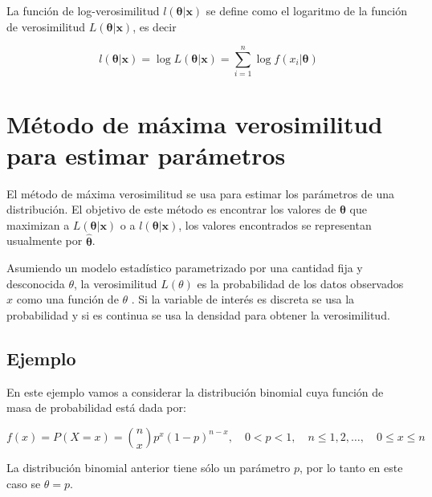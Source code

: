 \documentclass[
]{book}
\makeatletter
\newenvironment{kframe}{%
\medskip{}
\setlength{\fboxsep}{.8em}
 \def\at@end@of@kframe{}%
 \ifinner\ifhmode%
  \def\at@end@of@kframe{\end{minipage}}%
  \begin{minipage}{\columnwidth}%
 \fi\fi%
 \def\FrameCommand##1{\hskip\@totalleftmargin \hskip-\fboxsep
 \colorbox{shadecolor}{##1}\hskip-\fboxsep
     \hskip-\linewidth \hskip-\@totalleftmargin \hskip\columnwidth}%
 \MakeFramed {\advance\hsize-\width
   \@totalleftmargin\z@ \linewidth\hsize
   \@setminipage}}%
 {\par\unskip\endMakeFramed%
 \at@end@of@kframe}
\newenvironment{rmdblock}[1]
  {
  \begin{itemize}
  \renewcommand{\labelitemi}{
    \raisebox{-.7\height}[0pt][0pt]{
      {\setkeys{Gin}{width=3em,keepaspectratio}\texttt{[image: images/\#1]}}
    }
  }
  \setlength{\fboxsep}{1em}
  \begin{kframe}
  \item
  }
  {
  \end{kframe}
  \end{itemize}
  }
\newenvironment{rmdnote}
  {\begin{rmdblock}{note}}
  {\end{rmdblock}}
\makeatother
\begin{document}
La función de log-verosimilitud \(l(\boldsymbol{\theta} | \boldsymbol{x})\) se define como el logaritmo de la función de verosimilitud \(L(\boldsymbol{\theta} | \boldsymbol{x})\), es decir

\begin{equation}
l(\boldsymbol{\theta} | \boldsymbol{x}) = \log L(\boldsymbol{\theta} | \boldsymbol{x}) = \sum_{i=1}^{n} \log f(x_i | \boldsymbol{\theta})
\label{eq:loglik}
\end{equation}

\hypertarget{muxe9todo-de-muxe1xima-verosimilitud-para-estimar-paruxe1metros}{%
\section{Método de máxima verosimilitud para estimar parámetros}\label{muxe9todo-de-muxe1xima-verosimilitud-para-estimar-paruxe1metros}}

El método de máxima verosimilitud se usa para estimar los parámetros de una distribución. El objetivo de este método es encontrar los valores de \(\boldsymbol{\theta}\) que maximizan a \(L(\boldsymbol{\theta} | \boldsymbol{x})\) o a \(l(\boldsymbol{\theta} | \boldsymbol{x})\), los valores encontrados se representan usualmente por \(\hat{\boldsymbol{\theta}}\).

\begin{rmdnote}
Asumiendo un modelo estadístico parametrizado por una cantidad fija y desconocida \(\theta\), la verosimilitud \(L(\theta)\) es la probabilidad de los datos observados \(x\) como una función de \(\theta\) \citep{pawitan_2013}. Si la variable de interés es discreta se usa la probabilidad y si es continua se usa la densidad para obtener la verosimilitud.
\end{rmdnote}

\hypertarget{ejemplo-49}{%
\subsection*{Ejemplo}\label{ejemplo-49}}

En este ejemplo vamos a considerar la distribución binomial cuya función de masa de probabilidad está dada por:

\[f(x)=P(X=x)=\binom{n}{x} p^x (1-p)^{n-x}, \quad 0<p<1, \quad n \leq 1, 2, \ldots, \quad 0 \leq x \leq n\]

La distribución binomial anterior tiene sólo un parámetro \(p\), por lo tanto en este caso se \(\theta=p\).
\end{document}
